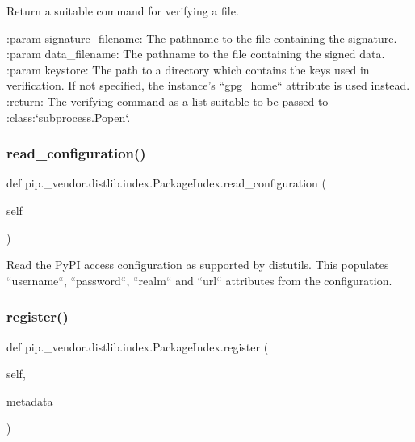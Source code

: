 \begin{DoxyVerb}Return a suitable command for verifying a file.

:param signature_filename: The pathname to the file containing the
                   signature.
:param data_filename: The pathname to the file containing the
              signed data.
:param keystore: The path to a directory which contains the keys
         used in verification. If not specified, the
         instance's ``gpg_home`` attribute is used instead.
:return: The verifying command as a list suitable to be
 passed to :class:`subprocess.Popen`.
\end{DoxyVerb}
 \mbox{\label{classpip_1_1__vendor_1_1distlib_1_1index_1_1PackageIndex_aa5372b63dc1e8726db61135b7a1c1907}} 
\subsubsection{\texorpdfstring{read\+\_\+configuration()}{read\_configuration()}}
{\footnotesize\ttfamily def pip.\+\_\+vendor.\+distlib.\+index.\+Package\+Index.\+read\+\_\+configuration (\begin{DoxyParamCaption}\item[{}]{self }\end{DoxyParamCaption})}

\begin{DoxyVerb}Read the PyPI access configuration as supported by distutils. This populates
``username``, ``password``, ``realm`` and ``url`` attributes from the
configuration.
\end{DoxyVerb}
 \mbox{\label{classpip_1_1__vendor_1_1distlib_1_1index_1_1PackageIndex_a27a2c45326f805aaa0cd980104d1ad66}} 
\subsubsection{\texorpdfstring{register()}{register()}}
{\footnotesize\ttfamily def pip.\+\_\+vendor.\+distlib.\+index.\+Package\+Index.\+register (\begin{DoxyParamCaption}\item[{}]{self,  }\item[{}]{metadata }\end{DoxyParamCaption})}


